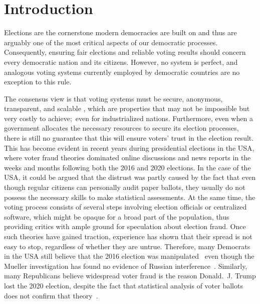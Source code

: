 \chapter{Introduction}\label{ch:intro}

Elections are the cornerstone modern democracies are built on and thus are arguably one of the most critical aspects of our democratic processes.
Consequently, ensuring fair elections and reliable voting results should concern every democratic nation and its citizens.
However, no system is perfect, and analogous voting systems currently employed by democratic countries are no exception to this rule.

The consensus view is that voting systems must be secure, anonymous, transparent, and scalable
\autocites[9-11]{jafar_blockchain_2021}[3]{diaz-santiso_e-voting_2021}{lowry_desirable_2009}[10-12]{tas_systematic_2020},
which are properties that may not be impossible but very costly to achieve;\ even for industrialized nations.
Furthermore, even when a government allocates the necessary resources to secure its election processes, there is still no
guarantee that this will ensure voters’ trust in the election result.
This has become evident in recent years during presidential elections in the \Gls{USA}, where voter fraud theories dominated online discussions and news reports in the weeks and months following both the 2016 and 2020 elections.
In the case of the \Gls{USA}, it could be argued that the distrust was partly caused by the fact that even though regular citizens can personally audit paper ballots, they usually do not possess the necessary skills to make statistical assessments.
At the same time, the voting process consists of several steps involving election officials or centralized software, which might be opaque for a broad part of the population, thus providing critics with ample ground for speculation about election fraud.
Once such theories have gained traction, experience has shown that their spread is not easy to stop, regardless of whether they are untrue.
Therefore, many Democrats in the \Gls{USA} still believe that the 2016 election was manipulated~\autocite{sinclair_its_2018} even though the Mueller investigation has found no evidence of Russian interference~\autocite{mueller_report_2019}.
Similarly, many Republicans believe widespread voter fraud is the reason Donald.\ J. Trump lost the 2020 election, despite the fact that statistical analysis of voter ballots does not confirm that theory~\autocite{eggers_no_2021}.


